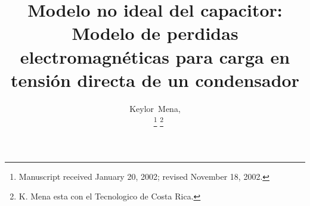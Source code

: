 \documentclass[journal]{IEEEtran}
\begin{document}
%
\title{Modelo no ideal del capacitor: Modelo de perdidas electromagnéticas para carga en tensión directa de un condensador}
%
%
\author{Keylor~Mena,\\~
\thanks{Manuscript received January 20, 2002; revised November 18, 2002.}%
\thanks{K. Mena esta con el Tecnologico de Costa Rica.}}
% 
%
%
% 

\end{document}
